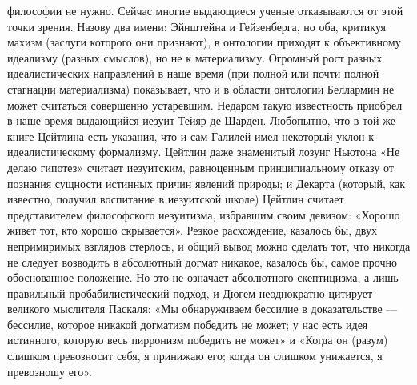 философии не  нужно. Сейчас  многие выдающиеся ученые  отказываются от
этой точки зрения. Назову два  имени: Эйнштейна и Гейзенберга, но оба,
критикуя махизм (заслуги которого  они признают), в онтологии приходят
к  объективному  идеализму (разных  смыслов),  но  не к  материализму.
Огромный  рост разных  идеалистических направлений  в наше  время (при
полной или  почти полной стагнации  материализма) показывает, что  и в
области онтологии Беллармин не  может считаться совершенно устаревшим.
Недаром  такую известность  приобрел  в наше  время выдающийся  иезуит
Тейяр де Шарден. Любопытно, что в той же книге Цейтлина есть указания,
что и сам Галилей имел  некоторый уклон к идеалистическому формализму.
Цейтлин  даже знаменитый  лозунг  Ньютона «Не  делаю гипотез»  считает
иезуитским,  равноценным принципиальному  отказу от  познания сущности
истинных  причин явлений  природы; и  Декарта (который,  как известно,
получил воспитание в иезуитской  школе) Цейтлин считает представителем
философского  иезуитизма,  избравшим   своим  девизом:  «Хорошо  живет
тот,  кто хорошо  скрывается». Резкое  расхождение, казалось  бы, двух
непримиримых взглядов стерлось,  и общий вывод можно  сделать тот, что
никогда не следует возводить в абсолютный догмат никакое, казалось бы,
самое прочно  обоснованное положение.  Но это не  означает абсолютного
скептицизма,  а лишь  правильный  пробабилистический  подход, и  Дюгем
неоднократно  цитирует великого  мыслителя  Паскаля: «Мы  обнаруживаем
бессилие  в доказательстве  ---  бессилие,  которое никакой  догматизм
победить не может;  у нас есть идея истинного,  которую весь пирронизм
победить не  может» и  «Когда он (разум)  слишком превозносит  себя, я
принижаю его; когда он слишком унижается, я превозношу его».

